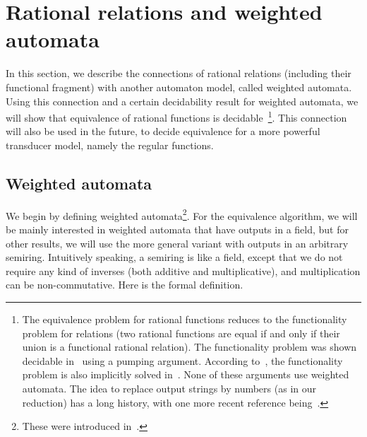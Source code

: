 \section{Rational relations and weighted automata}
\label{sec:weighted-automata}

In this section, we describe the connections of rational relations (including their functional fragment) with another automaton model, called weighted automata. Using this connection and a certain decidability result for weighted automata, we will show that equivalence of rational functions is decidable~\footnote{
The equivalence problem for rational functions reduces to the functionality problem for relations (two rational functions are equal if and only if their union is a functional rational relation). The functionality problem was shown decidable in~\cite[Theorem 1]{blattner1977single} using a pumping argument.
 According to~\cite{schutzenberger_oeuvres_tome08}, the functionality problem is also implicitly solved in~\cite{schutzenberger1976}. None of these arguments use weighted automata. The idea to replace output  strings by  numbers (as in our reduction) has a long history, with one more recent reference being~\cite[p. 21:4]{Seidl2018}.

}. This  connection will also be used in the future, to decide equivalence for a more powerful transducer model, namely the regular functions. 

\subsection{Weighted automata} We begin by defining weighted automata\footnote{These were introduced in~\cite[Definition 1]{Schutzenberger1961OnTheDefinition}.}. For the equivalence algorithm, we will be mainly interested in weighted automata that have outputs in a field, but for other results, we will use the more general variant with outputs in an arbitrary semiring. Intuitively speaking, a semiring is like a field, except that we do not require any kind of inverses (both additive and multiplicative), and multiplication can be non-commutative. Here is the formal definition.

